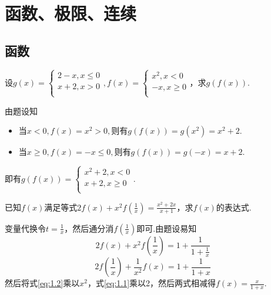 \chapter{函数、极限、连续}\label{cha:1}
\section{函数}
\begin{xiti}
\item 设$g\left(x\right)=\left\{\begin{array}{l}
2-x,x\le 0\\
x+2,x>0\\
\end{array},f\left(x\right)=\left\{\begin{array}{l}
x^2,x<0\\
-x,x\geqslant 0\\
\end{array}\right.\right. 
$，求$g(f(x))$.
\begin{solution}
	由题设知
	\begin{itemize}
		\item $\textrm{当}x<0,f\left(x\right)=x^2>0,\textrm{则有}g\left(f\left(x\right)\right)=g\left(x^2\right)=x^2+2$.
		\item $\textrm{当}x\geq 0,f\left(x\right)=-x\leq 0,\textrm{则有}g\left(f\left(x\right)\right)=g\left(-x\right)=x+2$.
	\end{itemize}
即有$g\left(f\left(x\right)\right)=\left\{\begin{array}{l}
x^2+2,x<0\\
x+2,x\geq 0\\
\end{array}\right. $.
\end{solution}
\item 已知$f(x)$满足等式$2 f ( x ) + x ^ { 2 } f \left( \frac { 1 } { x } \right) = \frac { x ^ { 2 } + 2 x } { x + 1 }$，求$f(x)$的表达式.
\begin{solution}
	变量代换令$t=\frac{1}{x}$，然后通分消$f(\frac{1}{x})$即可.由题设易知
	\begin{equation}\label{eq:1.1}
	2f\left(x\right)+x^2f\left(\frac{1}{x}\right)=1+\frac{1}{1+\frac{1}{x}}
	\end{equation}
	\begin{equation}\label{eq:1.2}
	2f\left(\frac{1}{x}\right)+\frac{1}{x^2}f\left(x\right)=1+\frac{1}{1+x}
	\end{equation}
	然后将式\ref{eq:1.2}乘以$x^{2}$，式\ref{eq:1.1}乘以2，然后两式相减得$
	f\left(x\right)=\frac{x}{1+x}$.
	

\end{solution}
\end{xiti}
